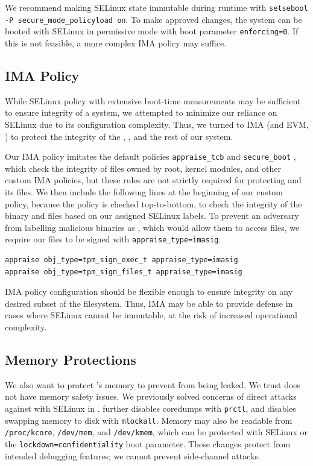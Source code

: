 \documentclass[12pt,letterpaper]{kuthesis}
\begin{document}
We recommend making SELinux state immutable during runtime with \texttt{setsebool -P secure\_mode\_policyload on}.
To make approved changes, the system can be booted with SELinux in permissive mode with boot parameter \texttt{enforcing=0}.
If this is not feasible, a more complex IMA policy may suffice.

\subsection{IMA Policy}\label{sec:implementation-ima}
While SELinux policy with extensive boot-time measurements may be sufficient to ensure integrity of a system,
we attempted to minimize our reliance on SELinux due to its configuration complexity.
Thus, we turned to IMA (and EVM, ) to protect the integrity of the \tpmsign, \wcp, and the rest of our system.

Our IMA policy imitates the default policies \verb|appraise_tcb| and \verb|secure_boot| \cite{IBM:IMA-Policy},
which check the integrity of files owned by root, kernel modules, and other custom IMA policies,
but these rules are not strictly required for protecting \tpmsign and its files.
We then include the following lines at the beginning of our custom policy, because the policy is checked top-to-bottom,
to check the integrity of the \tpmsign binary and files based on our assigned SELinux labels.
To prevent an adversary from labelling malicious binaries as \exect,
which would allow them to access \filet files,
we require our files to be signed with \verb|appraise_type=imasig|.
\begin{lstlisting}[style=ima-policy]
appraise obj_type=tpm_sign_exec_t appraise_type=imasig
appraise obj_type=tpm_sign_files_t appraise_type=imasig
\end{lstlisting}

IMA policy configuration should be flexible enough to ensure integrity on any desired subset of the filesystem.
Thus, IMA may be able to provide defense in cases where SELinux cannot be immutable,
at the risk of increased operational complexity.

\subsection{Memory Protections}
We also want to protect \tpmsign's memory to prevent \wcp from being leaked.
We trust \tpmsign does not have memory safety issues.
We previously solved concerns of direct attacks against \tpmsign with SELinux in .
\tpmsign further disables coredumps with \verb|prctl|, and disables swapping memory to disk with \verb|mlockall|.
Memory may also be readable from \verb|/proc/kcore|,
\verb|/dev/mem|, and \verb|/dev/kmem|,
which can be protected with SELinux or the \verb|lockdown=confidentiality| boot parameter.
These changes protect \wcp from intended debugging features;
we cannot prevent side-channel attacks.
\end{document}
